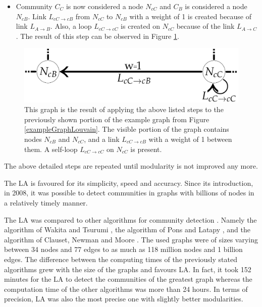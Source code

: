 \begin{enumerate} [label=\alph*)]
  \label{LA5}
  \begin{itemize}
    \item Community $C_{C}$ is now considered a node $N_{cC}$ and $C_{B}$ is considered a node $N_{cB}$. Link $L_{cC\rightarrow cB}$ from $N_{cC}$ to $N_{cB}$ with a weight of 1 is created because  of link $L_{A\rightarrow B}$. Also, a loop $L_{cC\rightarrow cC}$ is created on $N_{cC}$ because of the link $L_{A\rightarrow C}$. The result of this step can be observed in Figure \ref{exampleGraphLouvainEnde}.
  \end{itemize}  
  \begin{figure}[ht!]
    \centering
    \includegraphics[width=\textwidth]{Images/graphForCommunityEnde.png}
    \caption{This graph is the result of applying the above listed steps to the previously shown portion of the example graph from Figure \ref{exampleGraphLouvain}. The visible portion of the graph contains nodes $N_{cB}$ and $N_{cC}$, and a link $L_{cC\rightarrow cB}$ with a weight of 1 between them. A self-loop $L_{cC\rightarrow cC}$ on $N_{cC}$ is present.}
    \label{exampleGraphLouvainEnde}
\end{figure}     
\end{enumerate}
The above detailed steps are repeated until modularity is not improved any more.

The LA is favoured for its simplicity, speed and accuracy. Since its introduction, in 2008, it was possible to detect communities in graphs with billions of nodes in a relatively timely manner. 

The LA was compared to other algorithms for community detection \cite{louvainAlgorithm}.  Namely the algorithm of Wakita and Tsurumi \cite{wakitaAndToshiyuki}, the algorithm of Pons and Latapy \cite{ponsAndLatapy}, and the algorithm of Clauset, Newman and Moore \cite{CNM}. The used graphs were of sizes varying between 34 nodes and 77 edges to as much as 118 million nodes and 1 billion edges. The difference between the computing times of the previously stated algorithms grew with the size of the graphs and favours LA. In fact, it took 152 minutes for the LA to detect the communities of the greatest graph whereas the computation time of the other algorithms was more than 24 hours. In terms of precision, LA was also the most precise one with slightly better modularities.


